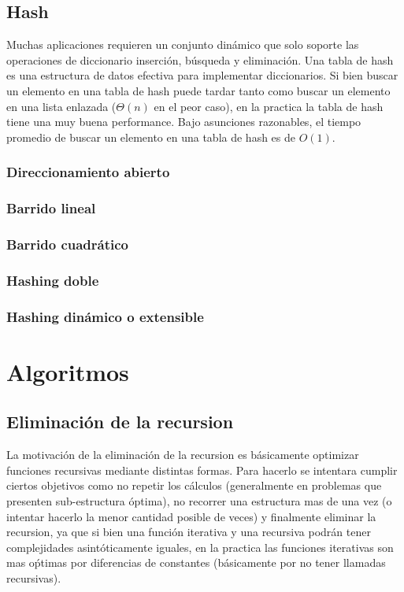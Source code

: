 \documentclass[10pt, a4paper]{report}
\begin{document}
\newpage
\section{Hash}

Muchas aplicaciones requieren un conjunto din\'amico que solo soporte las operaciones de diccionario inserci\'on, b\'usqueda y eliminaci\'on. Una tabla de hash es una estructura de datos efectiva para implementar diccionarios. Si bien buscar un elemento en una tabla de hash puede tardar tanto como buscar un elemento en una lista enlazada ($\Theta(n)$ en el peor caso), en la practica la tabla de hash tiene una muy buena performance. Bajo asunciones razonables, el tiempo promedio de buscar un elemento en una tabla de hash es de $O(1)$.

\subsection{Direccionamiento abierto}
\subsection{Barrido lineal}
\subsection{Barrido cuadr\'atico}
\subsection{Hashing doble}
\subsection{Hashing din\'amico o extensible}

\chapter{Algoritmos}

\section{Eliminaci\'on de la recursion}

La motivaci\'on de la eliminaci\'on de la recursion es b\'asicamente optimizar funciones recursivas mediante distintas formas. Para hacerlo se intentara cumplir ciertos objetivos como no repetir los c\'alculos (generalmente en problemas que presenten sub-estructura \'optima), no recorrer una estructura mas de una vez (o intentar hacerlo la menor cantidad posible de veces) y finalmente eliminar la recursion, ya que si bien una funci\'on iterativa y una recursiva podr\'an tener complejidades asint\'oticamente iguales, en la practica las funciones iterativas son mas o\'ptimas por diferencias de constantes (b\'asicamente por no tener llamadas recursivas).
\end{document}
